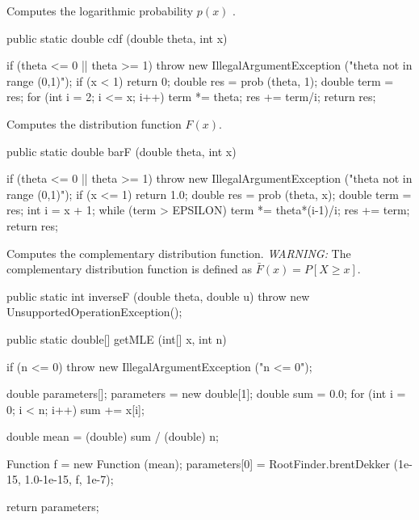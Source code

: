  \begin{tabb}
   Computes the logarithmic probability $p(x)$%
.
 \end{tabb}
\begin{code}

   public static double cdf (double theta, int x)\begin{hide} {
      if (theta <= 0 || theta >= 1)
         throw new IllegalArgumentException ("theta not in range (0,1)");
      if (x < 1)
         return 0;
      double res = prob (theta, 1);
      double term = res;
      for (int i = 2; i <= x; i++) {
         term *= theta;
         res += term/i;
      }
      return res;
   }\end{hide}
\end{code}
  \begin{tabb} Computes the distribution function $F(x)$.
  \end{tabb}
\begin{code}

   public static double barF (double theta, int x)\begin{hide} {
      if (theta <= 0 || theta >= 1)
         throw new IllegalArgumentException ("theta not in range (0,1)");
      if (x <= 1)
         return 1.0;
      double res = prob (theta, x);
      double term = res;
      int i = x + 1;
      while (term > EPSILON) {
         term *= theta*(i-1)/i;
         res += term;
      }
      return res;
   }\end{hide}
\end{code}
  \begin{tabb} Computes the complementary distribution function.
\emph{WARNING:} The complementary distribution function is defined as 
$\bar F(x) = P[X \ge x]$.
 \end{tabb}
\begin{code}\begin{hide}

   public static int inverseF (double theta, double u) {
      throw new UnsupportedOperationException();
   }\end{hide}

   public static double[] getMLE (int[] x, int n)\begin{hide} {
      if (n <= 0)
         throw new IllegalArgumentException ("n <= 0");

      double parameters[];
      parameters = new double[1];
      double sum = 0.0;
      for (int i = 0; i < n; i++) {
         sum += x[i];
      }

      double mean = (double) sum / (double) n;

      Function f = new Function (mean);
      parameters[0] = RootFinder.brentDekker (1e-15, 1.0-1e-15, f, 1e-7);

      return parameters;
   }\end{hide}
\end{code}

